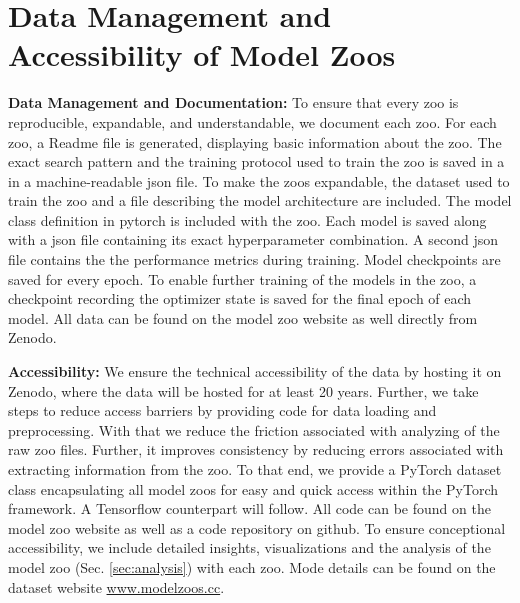 


\section{Data Management and Accessibility of Model Zoos}
\label{app:data_management}

\textbf{Data Management and Documentation:}
To ensure that every zoo is reproducible, expandable, and understandable, we document each zoo. 
For each zoo, a Readme file is generated, displaying basic information about the zoo.
The exact search pattern and the training protocol used to train the zoo is saved in a  in a machine-readable json file. 
To make the zoos expandable, the dataset used to train the zoo and a file describing the model architecture are included. 
The model class definition in pytorch is included with the zoo.
Each model is saved along with a json file containing its exact hyperparameter combination. A second json file contains the the performance metrics during training. Model checkpoints are saved for every epoch.
To enable further training of the models in the zoo, a checkpoint recording the optimizer state is saved for the final epoch of each model. 
%
All data can be found on the model zoo website as well directly from Zenodo. 

%
%
%
\textbf{Accessibility:}
We ensure the technical accessibility of the data by hosting it on Zenodo, where the data will be hosted for at least 20 years.
Further, we take steps to reduce access barriers by providing code for data loading and preprocessing. 
With that we reduce the friction associated with analyzing of the raw zoo files. 
Further, it improves consistency by reducing errors associated with extracting information from the zoo.
%
To that end, we provide a PyTorch dataset class encapsulating all model zoos for easy and quick access within the PyTorch framework. A Tensorflow counterpart will follow.
%
All code can be found on the model zoo website as well as a code repository on github.
To ensure conceptional accessibility, we include detailed insights, visualizations and the analysis of the model zoo (Sec. \ref{sec:analysis}) with each zoo.
%
Mode details can be found on the dataset website \href{www.modelzoos.cc}{www.modelzoos.cc}.


